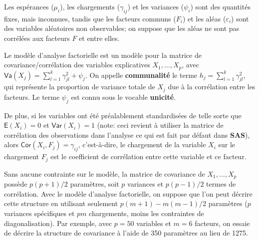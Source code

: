 \documentclass[
  11pt,
  letterpaper,
]{book}
\theoremstyle{definition}
\theoremstyle{definition}
\theoremstyle{definition}
\theoremstyle{definition}
\theoremstyle{remark}
\begin{document}
Les espérances (\(\mu_i\)), les chargements (\(\gamma_{ij}\)) et les variances (\(\psi_i\)) sont des quantités fixes, mais inconnues, tandis que les facteurs communs (\(F_i\)) et les aléas (\(\varepsilon_i\)) sont des variables aléatoires non observables; on suppose que les aléas ne sont pas corrélées aux facteurs \(F\) et entre elles.

Le modèle d'analyse factorielle est un modèle pour la matrice de covariance/corrélation des variables explicatives \(X_1, \ldots, X_p\), avec \(\mathsf{Va}(X_j) = \sum_{l=1}^k \gamma_{jl}^2 + \psi_j\). On appelle \textbf{communalité} le terme \(h_j = \sum_{l=1}^k \gamma_{jl}^2\), qui représente la proportion de variance totale de \(X_j\) due à la corrélation entre les facteurs. Le terme \(\psi_j\) est connu sous le vocable \textbf{unicité}.

De plus, si les variables ont été préalablement standardisées de telle sorte que \({\mathsf E}\left(X_i\right)=0\) et \({\mathsf{Var}}\left(X_i\right)=1\) (note: ceci revient à utiliser la matrice de corrélation des observations dans l'analyse ce qui est fait par défaut dans \textbf{SAS}), alors \({\mathsf{Cor}}\left(X_i, F_j\right)=\gamma_{ij}\), c'est-à-dire, le chargement de la variable \(X_i\) sur le chargement \(F_j\) est le coefficient de corrélation entre cette variable et ce facteur.

Sans aucune contrainte sur le modèle, la matrice de covariance de \(X_1, \ldots, X_p\) possède \(p(p+1)/2\) paramètres, soit \(p\) variances et \(p(p-1)/2\) termes de corrélation. Avec le modèle d'analyse factorielle, on suppose que l'on peut décrire cette structure en utilisant seulement \(p(m+1) - m(m-1)/2\) paramètres (\(p\) variances spécifiques et \(pm\) chargements, moins les contraintes de diagonalisation). Par exemple, avec \(p=50\) variables et \(m=6\) facteurs, on essaie de décrire la structure de covariance à l'aide de 350 paramètres au lieu de 1275.
\end{document}
